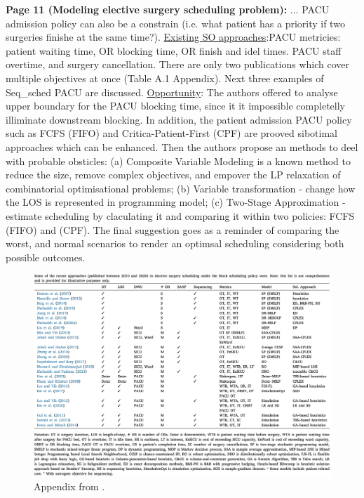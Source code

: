     \textbf{Page 11 (Modeling elective surgery scheduling problem):}
    ... PACU admission policy can also be a constrain (i.e. what patient has a priority if two surgeries finishe at the same time?). \underline{Existing SO approaches}:PACU metricies: patient waiting time, OR blocking time, OR finish and idel times. PACU staff overtime, and surgery cancellation. There are only two publications which cover multiple objectives at once (Table A.1 Appendix). Next three examples of Seq\_sched PACU are discussed. \underline{Opportunity}: The authors offered to analyse upper boundary for the PACU blocking time, since it it impossible completelly illiminate downstream blocking. In addition, the patient admission PACU policy such as FCFS (FIFO) and Critica-Patient-First (CPF) are prooved sibotimal approaches which can be enhanced. Then the authors propose an methods to deel with probable obsticles: (a) Composite Variable Modeling is a known method to reduce the size, remove complex objectives, and empover the LP relaxation of combinatorial optimisational problems; (b) Variable transformation - change how the LOS is represented in programming model; (c) Two-Stage Approximation - estimate scheduling by claculating it and comparing it within two policies: FCFS (FIFO) and (CPF). The final suggestion goes as a reminder of comparing the worst, and normal scenarios to render an optimsal scheduling considering both possible outcomes.
    \begin{figure}[H]
        \centering
        \includegraphics[width=1\textwidth]{figures/0015_SR04US22/fig9.png}
        \caption{Appendix from \cite{x335}.}
        \label{fig9:0015_SR04US22}
    \end{figure}

